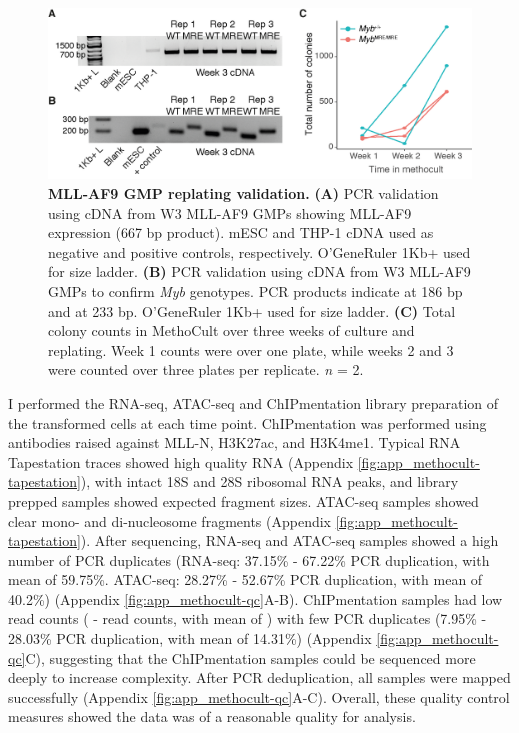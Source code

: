 \begin{figure}[!h]
    \centering
    \includegraphics[width=\textwidth,height=\textheight,keepaspectratio]{figures/chapter5/ch5_MethoCult-validation.png}
    \caption[{MLL-AF9 GMP replating validation.}]
    {\textbf{MLL-AF9 GMP replating validation.}
    \textbf{(A)} PCR validation using cDNA from W3 MLL-AF9 GMPs showing MLL-AF9 expression (667 bp product). mESC and THP-1 cDNA used as negative and positive controls, respectively. O'GeneRuler 1Kb+ used for size ladder. 
    \textbf{(B)} PCR validation using cDNA from W3 MLL-AF9 GMPs to confirm \textit{Myb} genotypes. PCR products indicate \mybwt{} at 186 bp and \mybmre{} at 233 bp. O'GeneRuler 1Kb+ used for size ladder. 
    \textbf{(C)} Total colony counts in MethoCult over three weeks of culture and replating. Week 1 counts were over one plate, while weeks 2 and 3 were counted over three plates per replicate. \textit{n} = 2. 
    }
    \label{fig:ch5_MethoCult-validation}
\end{figure}
\clearpage

I performed the RNA-seq, ATAC-seq and ChIPmentation library preparation of the transformed cells at each time point. ChIPmentation was performed using antibodies raised against MLL-N, H3K27ac, and H3K4me1. Typical RNA Tapestation traces showed high quality RNA (Appendix \ref{fig:app_methocult-tapestation}), with intact 18S and 28S ribosomal RNA peaks, and library prepped samples showed expected fragment sizes. ATAC-seq samples showed clear mono- and di-nucleosome fragments (Appendix \ref{fig:app_methocult-tapestation}). After sequencing, RNA-seq and ATAC-seq samples showed a high number of PCR duplicates (RNA-seq: 37.15\% - 67.22\% PCR duplication, with mean of 59.75\%. ATAC-seq: 28.27\% - 52.67\% PCR duplication, with mean of 40.2\%) (Appendix \ref{fig:app_methocult-qc}A-B). ChIPmentation samples had low read counts ( -  read counts, with mean of ) with few PCR duplicates (7.95\% - 28.03\% PCR duplication, with mean of 14.31\%) (Appendix \ref{fig:app_methocult-qc}C), suggesting that the ChIPmentation samples could be sequenced more deeply to increase complexity. After PCR deduplication, all samples were mapped successfully (Appendix \ref{fig:app_methocult-qc}A-C). Overall, these quality control measures showed the data was of a reasonable quality for analysis. 

